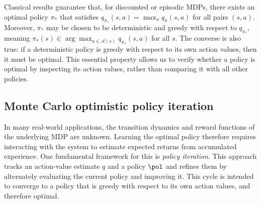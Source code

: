 Classical results guarantee that, for discounted or episodic MDPs, 
there exists an optimal policy $\pi_*$ that satisfies $q_{\pi_*}(s,a) = \max_\pi q_\pi(s,a)$ for all pairs $(s,a)$.
Moreover, $\pi_*$ may be chosen to be deterministic and greedy with respect to $q_{\pi_*}$, meaning
$\pi_*(s) \in \arg\max_{a \in \mathcal A(s)} q_{\pi_*}(s,a)$ for all $s$.
The converse is also true: if a deterministic policy is greedy with respect to its own action values, then it must be optimal.
This essential property allows us to verify whether a policy is optimal by inspecting its action values, rather than comparing it with all other policies.













































































\subsection{Monte Carlo optimistic policy iteration}

In many real-world applications, the transition dynamics and reward functions of the underlying MDP are unknown. Learning the optimal policy therefore requires interacting with the system to estimate expected returns from accumulated experience.
One fundamental framework for this is \textit{policy iteration}.
This approach tracks an action-value estimate $q$ and a policy $\pol$ and refines them by alternately evaluating the current policy and improving it.
This cycle is intended to converge to a policy that is greedy with respect to its own action values, and therefore optimal.


